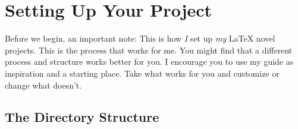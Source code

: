 %
%
%
%
%
%
%
%
%
%

\chapter{Setting Up Your Project} \label{chap:project}

Before we begin, an important note: This is how \emph{I} set up \emph{my}
\LaTeX{} novel projects. This is the process that works for me. You might find
that a different process and structure works better for you. I encourage you
to use my guide as inspiration and a starting place. Take what works for you
and customize or change what doesn't.

\section{The Directory Structure} \label{sec:structure}

